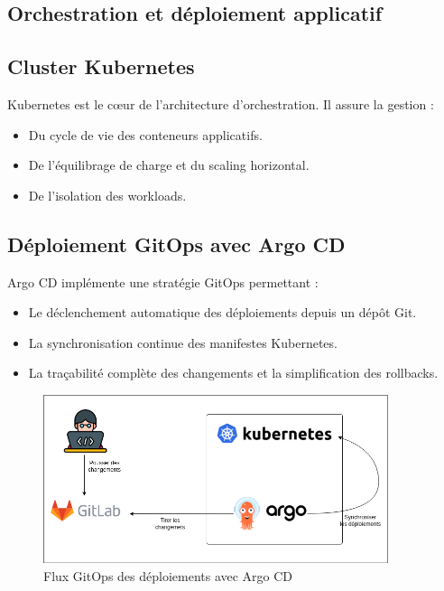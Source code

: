 \subsection{Orchestration et déploiement applicatif}

\subsection*{Cluster Kubernetes}

Kubernetes est le cœur de l’architecture d’orchestration. Il assure la gestion :
\begin{itemize}
	\item Du cycle de vie des conteneurs applicatifs.
	\item De l’équilibrage de charge et du scaling horizontal.
	\item De l’isolation des workloads.
\end{itemize}

\subsection*{Déploiement GitOps avec Argo CD}

Argo CD implémente une stratégie GitOps permettant :
\begin{itemize}
	\item Le déclenchement automatique des déploiements depuis un dépôt Git.
	\item La synchronisation continue des manifestes Kubernetes.
	\item La traçabilité complète des changements et la simplification des rollbacks.
\end{itemize}

\begin{figure}[H]
	\centering
	\includegraphics[width=0.9\textwidth]{figures/gitops-argo-cd.png}
	\caption{Flux GitOps des déploiements avec Argo CD}
\end{figure}


